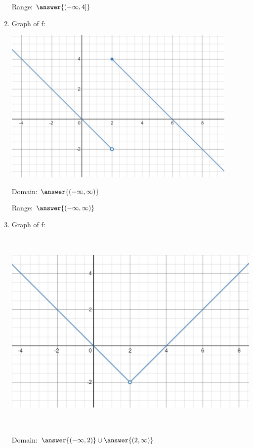 \documentclass{ximera}
\begin{document}
\begin{problem}
\begin{enumerate}
 Range:  $\answer{(-\infty,4]}$
 \item Graph of f:
     \begin{image}
   \includegraphics[height=3in]{160H2pic3.jpg}
 \end{image}
 
 Domain: $\answer{(-\infty,\infty)}$
 
 Range: $\answer{(-\infty,\infty)}$
 \item Graph of f:
     \begin{image}
   \includegraphics[height=4in]{160H2pic4.jpg}
 \end{image}
 
 Domain:  $\answer{(-\infty,2)}\cup\answer{(2,\infty)}$
 

\end{enumerate}
\end{problem}
\end{document}
